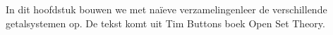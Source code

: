 \documentclass[../../../include/open-logic-section]{subfiles}
\begin{document}
	

\begin{editorial}
In dit hoofdstuk bouwen we met na\"ieve verzamelingenleer de
verschillende getalsystemen op. De tekst komt uit Tim Buttons boek
Open Set Theory.
\end{editorial}


\OLEndChapterHook
\end{document}
